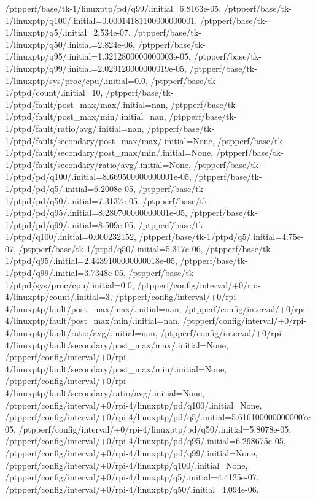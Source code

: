 {    /ptpperf/base/tk-1/linuxptp/pd/q99/.initial=6.8163e-05,
    /ptpperf/base/tk-1/linuxptp/q100/.initial=0.00014181100000000001,
    /ptpperf/base/tk-1/linuxptp/q5/.initial=2.534e-07,
    /ptpperf/base/tk-1/linuxptp/q50/.initial=2.824e-06,
    /ptpperf/base/tk-1/linuxptp/q95/.initial=1.3212800000000003e-05,
    /ptpperf/base/tk-1/linuxptp/q99/.initial=2.029120000000019e-05,
    /ptpperf/base/tk-1/linuxptp/sys/proc/cpu/.initial=0.0,
    /ptpperf/base/tk-1/ptpd/count/.initial=10,
    /ptpperf/base/tk-1/ptpd/fault/post_max/max/.initial=nan,
    /ptpperf/base/tk-1/ptpd/fault/post_max/min/.initial=nan,
    /ptpperf/base/tk-1/ptpd/fault/ratio/avg/.initial=nan,
    /ptpperf/base/tk-1/ptpd/fault/secondary/post_max/max/.initial=None,
    /ptpperf/base/tk-1/ptpd/fault/secondary/post_max/min/.initial=None,
    /ptpperf/base/tk-1/ptpd/fault/secondary/ratio/avg/.initial=None,
    /ptpperf/base/tk-1/ptpd/pd/q100/.initial=8.669500000000001e-05,
    /ptpperf/base/tk-1/ptpd/pd/q5/.initial=6.2008e-05,
    /ptpperf/base/tk-1/ptpd/pd/q50/.initial=7.3137e-05,
    /ptpperf/base/tk-1/ptpd/pd/q95/.initial=8.280700000000001e-05,
    /ptpperf/base/tk-1/ptpd/pd/q99/.initial=8.509e-05,
    /ptpperf/base/tk-1/ptpd/q100/.initial=0.000232152,
    /ptpperf/base/tk-1/ptpd/q5/.initial=4.75e-07,
    /ptpperf/base/tk-1/ptpd/q50/.initial=5.317e-06,
    /ptpperf/base/tk-1/ptpd/q95/.initial=2.4439100000000018e-05,
    /ptpperf/base/tk-1/ptpd/q99/.initial=3.7348e-05,
    /ptpperf/base/tk-1/ptpd/sys/proc/cpu/.initial=0.0,
    /ptpperf/config/interval/+0/rpi-4/linuxptp/count/.initial=3,
    /ptpperf/config/interval/+0/rpi-4/linuxptp/fault/post_max/max/.initial=nan,
    /ptpperf/config/interval/+0/rpi-4/linuxptp/fault/post_max/min/.initial=nan,
    /ptpperf/config/interval/+0/rpi-4/linuxptp/fault/ratio/avg/.initial=nan,
    /ptpperf/config/interval/+0/rpi-4/linuxptp/fault/secondary/post_max/max/.initial=None,
    /ptpperf/config/interval/+0/rpi-4/linuxptp/fault/secondary/post_max/min/.initial=None,
    /ptpperf/config/interval/+0/rpi-4/linuxptp/fault/secondary/ratio/avg/.initial=None,
    /ptpperf/config/interval/+0/rpi-4/linuxptp/pd/q100/.initial=None,
    /ptpperf/config/interval/+0/rpi-4/linuxptp/pd/q5/.initial=5.6161000000000007e-05,
    /ptpperf/config/interval/+0/rpi-4/linuxptp/pd/q50/.initial=5.8078e-05,
    /ptpperf/config/interval/+0/rpi-4/linuxptp/pd/q95/.initial=6.298675e-05,
    /ptpperf/config/interval/+0/rpi-4/linuxptp/pd/q99/.initial=None,
    /ptpperf/config/interval/+0/rpi-4/linuxptp/q100/.initial=None,
    /ptpperf/config/interval/+0/rpi-4/linuxptp/q5/.initial=4.4125e-07,
    /ptpperf/config/interval/+0/rpi-4/linuxptp/q50/.initial=4.094e-06,
}
